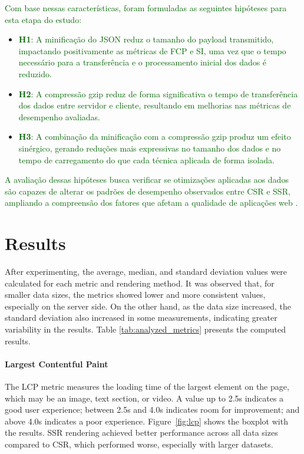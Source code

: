 \documentclass{sbc2019}%
\begin{document}
\textcolor{darkgreen}{Com base nessas características, foram formuladas as seguintes hipóteses para esta etapa do estudo:}

\begin{itemize}
    \item \textcolor{darkgreen}{\textbf{H1}: A minificação do JSON reduz o tamanho do payload transmitido, impactando positivamente as métricas de FCP e SI, uma vez que o tempo necessário para a transferência e o processamento inicial dos dados é reduzido.}
    \item \textcolor{darkgreen}{\textbf{H2}: A compressão gzip reduz de forma significativa o tempo de transferência dos dados entre servidor e cliente, resultando em melhorias nas métricas de desempenho avaliadas.}
    \item \textcolor{darkgreen}{\textbf{H3}: A combinação da minificação com a compressão gzip produz um efeito sinérgico, gerando reduções mais expressivas no tamanho dos dados e no tempo de carregamento do que cada técnica aplicada de forma isolada.}
\end{itemize}

\textcolor{darkgreen}{A avaliação dessas hipóteses busca verificar se otimizações aplicadas aos dados são capazes de alterar os padrões de desempenho observados entre CSR e SSR, ampliando a compreensão dos fatores que afetam a qualidade de aplicações web \cite{ollila:2021, gangishetti:2026}.}

\section{Results}\label{sec:results}

After experimenting, the average, median, and standard deviation values were calculated for each metric and rendering method. It was observed that, for smaller data sizes, the metrics showed lower and more consistent values, especially on the server side. On the other hand, as the data size increased, the standard deviation also increased in some measurements, indicating greater variability in the results. Table \ref{tab:analyzed_metrics} presents the computed results.



\paragraph{\textbf{Largest Contentful Paint}}
The LCP metric measures the loading time of the largest element on the page, which may be an image, text section, or video. A value up to 2.5s indicates a good user experience; between 2.5s and 4.0s indicates room for improvement; and above 4.0s indicates a poor experience. Figure~\ref{fig:lcp} shows the boxplot with the results. SSR rendering achieved better performance across all data sizes compared to CSR, which performed worse, especially with larger datasets.
\end{document}
